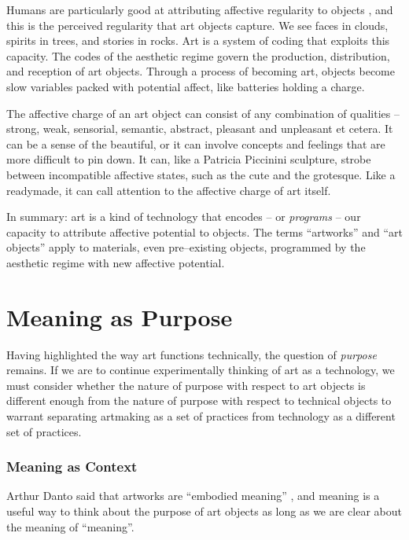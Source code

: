 \documentclass[letter:wpaper]{article}
\begin{document}
    Humans are particularly good at attributing affective regularity to objects \citep{FristonThFrEnrgPrncpl2010} \citep{DeaconTheSymbolicSpecies1998}, and this is the perceived regularity that art objects capture. We see faces in clouds, spirits in trees, and stories in rocks. Art is a system of coding that exploits this capacity. The codes of the aesthetic regime govern the production, distribution, and reception of art objects. Through a process of becoming art, objects become slow variables packed with potential affect, like batteries holding a charge.

    The affective charge of an art object can consist of any combination of qualities – strong, weak, sensorial, semantic, abstract, pleasant and unpleasant et cetera. It can be a sense of the beautiful, or it can involve concepts and feelings that are more difficult to pin down. It can, like a Patricia Piccinini sculpture, strobe between incompatible affective states, such as the cute and the grotesque. Like a readymade, it can call attention to the affective charge of art itself.

    In summary: art is a kind of technology that encodes – or \emph{programs} – our capacity to attribute affective potential to objects. The terms “artworks” and “art objects” apply to materials, even pre–existing objects, programmed by the aesthetic regime with new affective potential.
    
\section{Meaning as Purpose}

    Having highlighted the way art functions technically, the question of \emph{purpose} remains. If we are to continue experimentally thinking of art as a technology, we must consider whether the nature of purpose with respect to art objects is different enough from the nature of purpose with respect to technical objects to warrant separating artmaking as a set of practices from technology as a different set of practices.
    
    \subsubsection{Meaning as Context}

    Arthur Danto said that artworks are “embodied meaning” \citep[p.125]{DantoEmbdMnngs2007}, and meaning is a useful way to think about the purpose of art objects as long as we are clear about the meaning of “meaning”.
    
\end{document}
